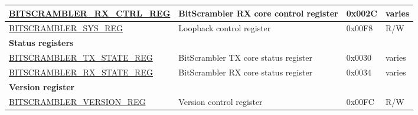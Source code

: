 \begin{longtable}{ | p{6.3cm} | p{7cm} | p{1.2cm} | p{1cm} | }
\hyperref[regdesc:BITSCRAMBLERRXCTRLREG]{BITSCRAMBLER\_RX\_CTRL\_REG} & BitScrambler RX core control register & 0x002C & varies \\ \hline
\hyperref[regdesc:BITSCRAMBLERSYSREG]{BITSCRAMBLER\_SYS\_REG} & Loopback control register & 0x00F8 & R/W \\ \hline
\multicolumn{4}{|l|}{\textbf{Status registers}} \\ \hline
\hyperref[regdesc:BITSCRAMBLERTXSTATEREG]{BITSCRAMBLER\_TX\_STATE\_REG} & BitScrambler TX core status register & 0x0030 & varies \\ \hline
\hyperref[regdesc:BITSCRAMBLERRXSTATEREG]{BITSCRAMBLER\_RX\_STATE\_REG} & BitScrambler RX core status register & 0x0034 & varies \\ \hline
\multicolumn{4}{|l|}{\textbf{Version register}} \\ \hline
\hyperref[regdesc:BITSCRAMBLERVERSIONREG]{BITSCRAMBLER\_VERSION\_REG} & Version control register & 0x00FC & R/W \\ \hline
\end{longtable}
